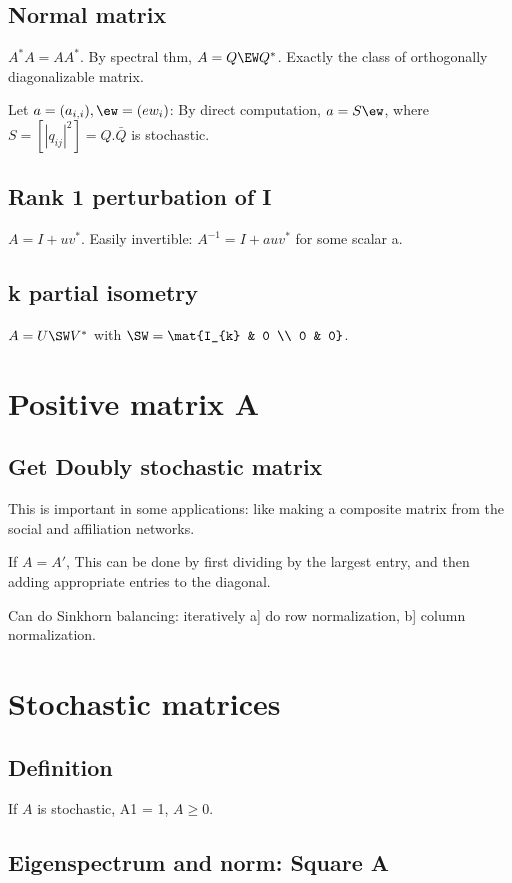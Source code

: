 \documentclass[oneside, article]{memoir}
\begin{document}
\subsection{Normal matrix}
$A^{*}A= AA^{*}$. By spectral thm, $A = Q \EW Q^{*}$. Exactly the class of orthogonally diagonalizable matrix.

Let $a = (a_{i,i}), \ew = (ew_{i})$: By direct computation, $a = S\ew$, where $S = [|q_{ij}|^{2}] = Q.\bar{Q}$ is stochastic.

\subsection{Rank 1 perturbation of I}
$A=I+uv^{*}$. Easily invertible: $A^{-1} = I + auv^{*}$ for some scalar a.

\subsection{k partial isometry}
$A = U \SW V^{*}$ with $\SW = \mat{I_{k} & 0 \\ 0 & 0}$.

\section{Positive matrix A}
\subsection{Get Doubly stochastic matrix}
This is important in some applications: like making a composite matrix from the social and affiliation networks.

If $A = A'$, This can be done by first dividing by the largest entry, and then adding appropriate entries to the diagonal.

Can do Sinkhorn balancing: iteratively a] do row normalization, b] column normalization.

\section{Stochastic matrices}
\subsection{Definition}
If $A$ is stochastic, A1 = 1, $A\geq 0$.

\subsection{Eigenspectrum and norm: Square A}
\end{document}
